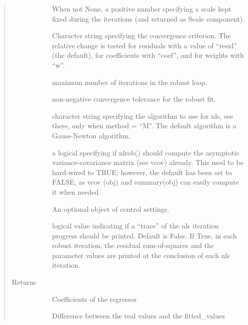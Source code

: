 \documentclass[letterpaper,10pt,english]{sphinxmanual}
\begin{document}
\begin{fulllineitems}
\begin{quote}
\begin{description}
\begin{description}
\item[{}] \leavevmode
When not None, a positive number specifying a scale kept fixed during
the iterations (and returned as Scale component).

\item[{}] \leavevmode
Character string specifying the convergence criterion. The relative
change is tested for residuals with a value of “resid” (the default),
for coefficients with “coef”, and for weights with “w”.

\item[{}] \leavevmode
maximum number of iterations in the robust loop.

\item[{}] \leavevmode
non-negative convergence tolerance for the robust fit.

\item[{}] \leavevmode
character string specifying the algorithm to use for nls, see there, 
only when method = “M”. The default algorithm is a Gauss-Newton 
algorithm.

\item[{}] \leavevmode
a logical specifying if nlrob() should compute the asymptotic 
variance-covariance matrix (see vcov) already. This used to be 
hard-wired to TRUE; however, the default has been set to FALSE, as vcov
(obj) and summary(obj) can easily compute it when needed.

\item[{}] \leavevmode
An optional object of control settings.

\item[{}] \leavevmode
logical value indicating if a “trace” of the nls iteration progress 
should be printed. Default is False. 
If True, in each robust iteration, the residual sum-of-squares and the 
parameter values are printed at the conclusion of each nls iteration.

\end{description}

\item[{Returns}] \leavevmode\begin{description}
\item[{}] \leavevmode
Coefficients of the regressor

\item[{}] \leavevmode
Difference between the real values and the fitted\_values


\end{description}
\end{description}
\end{quote}
\end{fulllineitems}
\end{document}
